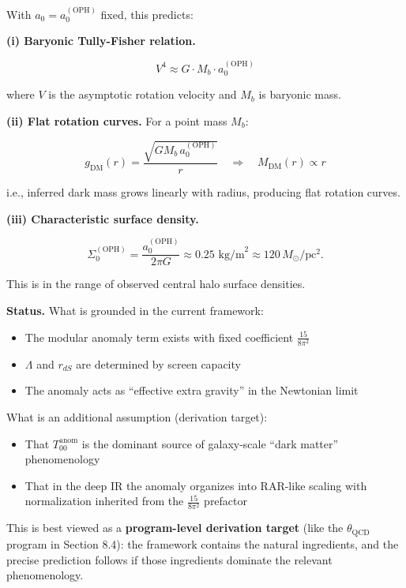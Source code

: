 \documentclass[11pt,a4paper]{article}
\theoremstyle{remark}
\providecommand{\tightlist}{%
  \setlength{\itemsep}{0pt}\setlength{\parskip}{0pt}}
\begin{document}
With \(a_0 = a_0^{\mathrm{(OPH)}}\) fixed, this predicts:

\textbf{(i) Baryonic Tully-Fisher relation.}

\[
V^4 \approx G \cdot M_b \cdot a_0^{\mathrm{(OPH)}}
\]

where \(V\) is the asymptotic rotation velocity and \(M_b\) is baryonic mass.

\textbf{(ii) Flat rotation curves.} For a point mass \(M_b\):

\[
g_{\mathrm{DM}}(r) = \frac{\sqrt{G M_b \, a_0^{\mathrm{(OPH)}}}}{r}
\quad \Rightarrow \quad
M_{\mathrm{DM}}(r) \propto r
\]

i.e., inferred dark mass grows linearly with radius, producing flat rotation
curves.

\textbf{(iii) Characteristic surface density.}

\[
\Sigma_0^{\mathrm{(OPH)}} = \frac{a_0^{\mathrm{(OPH)}}}{2\pi G}
\approx 0.25 \text{ kg/m}^2 \approx 120 \, M_\odot/\text{pc}^2.
\]

This is in the range of observed central halo surface densities.

\textbf{Status.} What is grounded in the current framework:

\begin{itemize}
\tightlist
\item
  The modular anomaly term exists with fixed coefficient \(\frac{15}{8\pi^2}\)
\item
  \(\Lambda\) and \(r_{dS}\) are determined by screen capacity
\item
  The anomaly acts as ``effective extra gravity'' in the Newtonian limit
\end{itemize}

What is an additional assumption (derivation target):

\begin{itemize}
\tightlist
\item
  That \(T_{00}^{\mathrm{anom}}\) is the dominant source of galaxy-scale
  ``dark matter'' phenomenology
\item
  That in the deep IR the anomaly organizes into RAR-like scaling with
  normalization inherited from the \(\frac{15}{8\pi^2}\) prefactor
\end{itemize}

This is best viewed as a \textbf{program-level derivation target} (like the
\(\theta_{\mathrm{QCD}}\) program in Section 8.4): the framework contains
the natural ingredients, and the precise prediction follows if those
ingredients dominate the relevant phenomenology.
\end{document}
